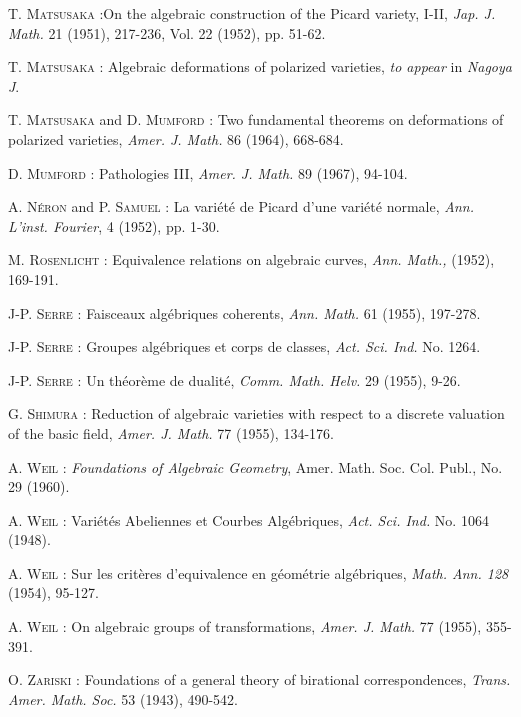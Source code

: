 \begin{thebibliography}{99}
 \textsc{T. Matsusaka :}\pageoriginale On the algebraic construction of the Picard variety, I-II, {\em Jap. J. Math.} 21 (1951), 217-236, Vol. 22 (1952), pp. 51-62.

 \textsc{T. Matsusaka :} Algebraic deformations of polarized varieties, {\em to appear} in {\em Nagoya J}.

 \textsc{T. Matsusaka} and \textsc{D. Mumford :} Two fundamental theorems on deformations of polarized varieties, {\em Amer. J. Math.} 86 (1964), 668-684.

 \textsc{D. Mumford :} Pathologies III, {\em Amer. J. Math.} 89 (1967), 94-104.

 \textsc{A. N\'eron} and \textsc{P. Samuel :} La vari\'et\'e de Picard d'une vari\'et\'e normale, {\em Ann. L'inst. Fourier}, 4 (1952), pp. 1-30.

 \textsc{M. Rosenlicht :} Equivalence relations on algebraic curves, {\em Ann. Math.,} (1952), 169-191.

 \textsc{J-P. Serre :} Faisceaux alg\'ebriques coherents, {\em Ann. Math.} 61 (1955), 197-278.

 \textsc{J-P. Serre :} Groupes alg\'ebriques et corps de classes, {\em Act. Sci. Ind.} No. 1264.

 \textsc{J-P. Serre :} Un th\'eor\`eme de dualit\'e, {\em Comm. Math. Helv.} 29 (1955), 9-26.

 \textsc{G. Shimura :} Reduction of algebraic varieties with respect to a discrete valuation of the basic field, {\em Amer. J. Math.} 77 (1955), 134-176.

 \textsc{A. Weil :} {\em Foundations of Algebraic Geometry}, Amer. Math. Soc. Col. Publ., No. 29 (1960).

 \textsc{A. Weil :} Vari\'et\'es Abeliennes et Courbes Alg\'ebriques, {\em Act. Sci. Ind.} No. 1064 (1948).

 \textsc{A. Weil :} Sur les crit\`eres d'equivalence en g\'eom\'etrie alg\'ebriques, {\em Math. Ann. 128} (1954), 95-127.

 \textsc{A. Weil :} On algebraic groups of transformations, {\em Amer. J. Math.} 77 (1955), 355-391.

 \textsc{O. Zariski :} Foundations of a general theory of birational correspondences, {\em Trans. Amer. Math. Soc.} 53 (1943), 490-542.


\end{thebibliography}
